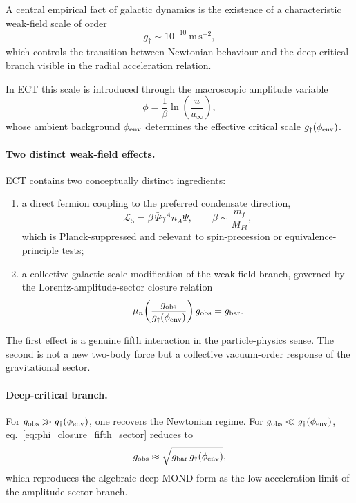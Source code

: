 \documentclass[11pt,a4paper]{article}
\numberwithin{equation}{section}
\begin{document}
A central empirical fact of galactic dynamics is the existence of a
characteristic weak-field scale of order
\begin{equation}
g_\dagger \sim 10^{-10}\ \mathrm{m\,s^{-2}},
\end{equation}
which controls the transition between Newtonian behaviour and the
deep-critical branch visible in the radial acceleration relation.

In ECT this scale is introduced through the macroscopic amplitude variable
\begin{equation}
\phi = \frac{1}{\beta}\ln\!\left(\frac{u}{u_\infty}\right),
\end{equation}
whose ambient background $\phi_{\rm env}$ determines the effective
critical scale $g_\dagger(\phi_{\rm env})$.

\paragraph{Two distinct weak-field effects.}
ECT contains two conceptually distinct ingredients:
\begin{enumerate}
\item a direct fermion coupling to the preferred condensate direction,
\begin{equation}
\mathcal{L}_5=\beta\,\bar\Psi\gamma^A n_A\Psi,
\qquad
\beta \sim \frac{m_f}{M_{Pl}},
\end{equation}
which is Planck-suppressed and relevant to spin-precession or
equivalence-principle tests;
\item a collective galactic-scale modification of the weak-field branch,
governed by the Lorentz-amplitude-sector closure relation
\begin{equation}
\mu_n\!\left(\frac{g_{\rm obs}}{g_\dagger(\phi_{\rm env})}\right)
g_{\rm obs}
=
g_{\rm bar}.
\label{eq:phi_closure_fifth_sector}
\end{equation}
\end{enumerate}

The first effect is a genuine fifth interaction in the particle-physics
sense. The second is not a new two-body force but a collective
vacuum-order response of the gravitational sector.

\paragraph{Deep-critical branch.}
For $g_{\rm obs}\gg g_\dagger(\phi_{\rm env})$, one recovers the
Newtonian regime. For $g_{\rm obs}\ll g_\dagger(\phi_{\rm env})$,
eq.~\eqref{eq:phi_closure_fifth_sector} reduces to
\begin{equation}
g_{\rm obs}\approx \sqrt{g_{\rm bar}\,g_\dagger(\phi_{\rm env})},
\end{equation}
which reproduces the algebraic deep-MOND form as the low-acceleration
limit of the amplitude-sector branch.
\end{document}
